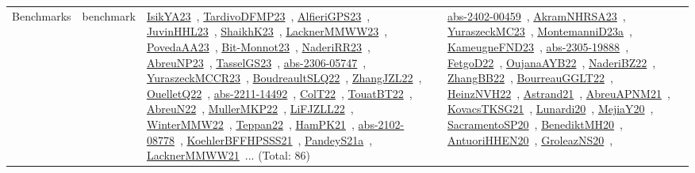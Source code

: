 {\begin{longtable}{lp{3cm}>{\raggedright\arraybackslash}p{6cm}>{\raggedright\arraybackslash}p{6cm}>{\raggedright\arraybackslash}p{8cm}}
Benchmarks & benchmark & \href{works/IsikYA23.pdf}{IsikYA23}~\cite{IsikYA23}, \href{works/TardivoDFMP23.pdf}{TardivoDFMP23}~\cite{TardivoDFMP23}, \href{works/AlfieriGPS23.pdf}{AlfieriGPS23}~\cite{AlfieriGPS23}, \href{works/JuvinHHL23.pdf}{JuvinHHL23}~\cite{JuvinHHL23}, \href{works/ShaikhK23.pdf}{ShaikhK23}~\cite{ShaikhK23}, \href{works/LacknerMMWW23.pdf}{LacknerMMWW23}~\cite{LacknerMMWW23}, \href{works/PovedaAA23.pdf}{PovedaAA23}~\cite{PovedaAA23}, \href{works/Bit-Monnot23.pdf}{Bit-Monnot23}~\cite{Bit-Monnot23}, \href{works/NaderiRR23.pdf}{NaderiRR23}~\cite{NaderiRR23}, \href{works/AbreuNP23.pdf}{AbreuNP23}~\cite{AbreuNP23}, \href{works/TasselGS23.pdf}{TasselGS23}~\cite{TasselGS23}, \href{works/abs-2306-05747.pdf}{abs-2306-05747}~\cite{abs-2306-05747}, \href{works/YuraszeckMCCR23.pdf}{YuraszeckMCCR23}~\cite{YuraszeckMCCR23}, \href{works/BoudreaultSLQ22.pdf}{BoudreaultSLQ22}~\cite{BoudreaultSLQ22}, \href{works/ZhangJZL22.pdf}{ZhangJZL22}~\cite{ZhangJZL22}, \href{works/OuelletQ22.pdf}{OuelletQ22}~\cite{OuelletQ22}, \href{works/abs-2211-14492.pdf}{abs-2211-14492}~\cite{abs-2211-14492}, \href{works/ColT22.pdf}{ColT22}~\cite{ColT22}, \href{works/TouatBT22.pdf}{TouatBT22}~\cite{TouatBT22}, \href{works/AbreuN22.pdf}{AbreuN22}~\cite{AbreuN22}, \href{works/MullerMKP22.pdf}{MullerMKP22}~\cite{MullerMKP22}, \href{works/LiFJZLL22.pdf}{LiFJZLL22}~\cite{LiFJZLL22}, \href{works/WinterMMW22.pdf}{WinterMMW22}~\cite{WinterMMW22}, \href{works/Teppan22.pdf}{Teppan22}~\cite{Teppan22}, \href{works/HamPK21.pdf}{HamPK21}~\cite{HamPK21}, \href{works/abs-2102-08778.pdf}{abs-2102-08778}~\cite{abs-2102-08778}, \href{works/KoehlerBFFHPSSS21.pdf}{KoehlerBFFHPSSS21}~\cite{KoehlerBFFHPSSS21}, \href{works/PandeyS21a.pdf}{PandeyS21a}~\cite{PandeyS21a}, \href{works/LacknerMMWW21.pdf}{LacknerMMWW21}~\cite{LacknerMMWW21}... (Total: 86) & \href{works/abs-2402-00459.pdf}{abs-2402-00459}~\cite{abs-2402-00459}, \href{works/AkramNHRSA23.pdf}{AkramNHRSA23}~\cite{AkramNHRSA23}, \href{works/YuraszeckMC23.pdf}{YuraszeckMC23}~\cite{YuraszeckMC23}, \href{works/MontemanniD23a.pdf}{MontemanniD23a}~\cite{MontemanniD23a}, \href{works/KameugneFND23.pdf}{KameugneFND23}~\cite{KameugneFND23}, \href{works/abs-2305-19888.pdf}{abs-2305-19888}~\cite{abs-2305-19888}, \href{works/FetgoD22.pdf}{FetgoD22}~\cite{FetgoD22}, \href{works/OujanaAYB22.pdf}{OujanaAYB22}~\cite{OujanaAYB22}, \href{works/NaderiBZ22.pdf}{NaderiBZ22}~\cite{NaderiBZ22}, \href{works/ZhangBB22.pdf}{ZhangBB22}~\cite{ZhangBB22}, \href{works/BourreauGGLT22.pdf}{BourreauGGLT22}~\cite{BourreauGGLT22}, \href{works/HeinzNVH22.pdf}{HeinzNVH22}~\cite{HeinzNVH22}, \href{works/Astrand21.pdf}{Astrand21}~\cite{Astrand21}, \href{works/AbreuAPNM21.pdf}{AbreuAPNM21}~\cite{AbreuAPNM21}, \href{works/KovacsTKSG21.pdf}{KovacsTKSG21}~\cite{KovacsTKSG21}, \href{works/Lunardi20.pdf}{Lunardi20}~\cite{Lunardi20}, \href{works/MejiaY20.pdf}{MejiaY20}~\cite{MejiaY20}, \href{works/SacramentoSP20.pdf}{SacramentoSP20}~\cite{SacramentoSP20}, \href{works/BenediktMH20.pdf}{BenediktMH20}~\cite{BenediktMH20}, \href{works/AntuoriHHEN20.pdf}{AntuoriHHEN20}~\cite{AntuoriHHEN20}, \href{works/GroleazNS20.pdf}{GroleazNS20}~\cite{GroleazNS20}, 
\end{longtable}}
